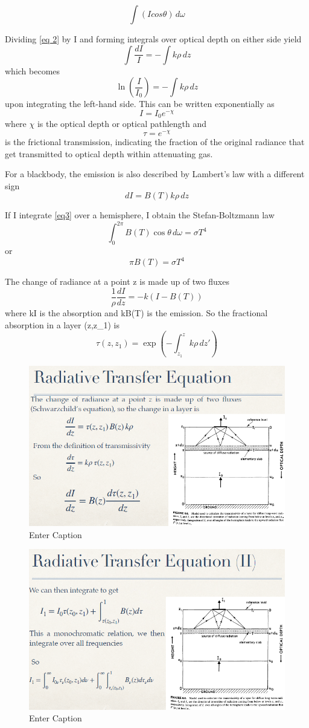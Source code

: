\begin{equation}\label{eq 2}
	\int(Icos\theta )\,d\omega
\end{equation}

Dividing \ref{eq 2} by I and forming integrals over optical depth on either side yield
$$\int \frac{dI}{I} = - \int k \rho \, dz$$ which becomes $$\ln \left( \frac{I}{I_0} \right) = - \int k \rho \, dz$$
upon integrating the left-hand side.
This can be written exponentially as $$I = I_0 e^{-\chi}$$
where $\chi$ is the optical depth or optical pathlength and $$\tau = e^{-\chi}$$
is the frictional transmission, indicating the fraction of the original radiance that get transmitted to optical depth within attenuating gas.

For a blackbody, the emission is also described by Lambert's law with a different sign
\begin{equation}\label{eq3}
	dI = B(T) k \rho \, dz
\end{equation}

If I integrate \ref{eq3} over a hemisphere, I obtain the Stefan-Boltzmann law
$$\int_0^{2\pi} B(T) \cos \theta \, d\omega = \sigma T^4$$
or $$\pi B(T) = \sigma T^4$$

The change of radiance at a point z is made up of two fluxes
$$\frac{1}{\rho} \frac{dI}{dz} = -k (I - B(T))$$ where kI is the absorption and kB(T) is the emission.
So the fractional absorption in a layer (z,z_1) is $$\tau(z, z_1) = \exp \left( - \int_{z_1}^z k \rho \, dz' \right)$$

\begin{figure}[h!]
	\centering
	\includegraphics[width=0.5\linewidth]{uploads/16image.png}
	\caption{Enter Caption}
	\label{fig:enter-label}
\end{figure}

\begin{figure}[h!]
	\centering
	\includegraphics[width=0.5\linewidth]{uploads/17image.png}
	\caption{Enter Caption}
	\label{fig:enter-label}
\end{figure}

